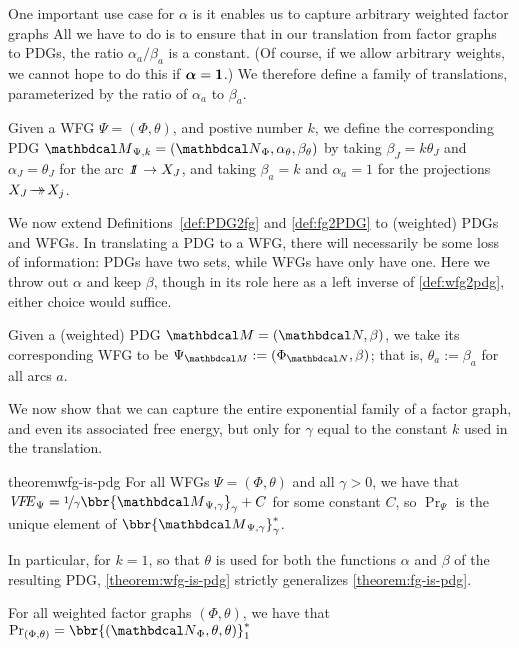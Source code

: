 One important use case for $\alpha$ is 
    it enables us to capture arbitrary weighted factor graphs
All we have to do is to ensure that in our translation from
factor graphs to PDGs, the ratio $\alpha_a/\beta_a$ is a
constant.  (Of course, if we allow arbitrary weights, we cannot hope
to do this if $\boldsymbol\alpha = \mathbf 1$.)  
We therefore define a family of translations, parameterized by the
ratio of $\alpha_a$ to $\beta_a$.
\begin{defn}\label{def:wfg2pdg}
Given a WFG
$\Psi=(\Phi, \theta)$,
and postive number $k$, 
we define the corresponding PDG $\PDGof{\Psi,k} = (\UPDGof{\Phi},\alpha_{\theta}, \beta_{\theta})$ 
by taking $\beta_J = k \theta_J$ and $\alpha_J = \theta_J$ for the arc
 $\pdgunit  \rightarrow X_J$, and
taking $\beta_a = k$ and $\alpha_a = 1$ for the projections $X_J \!\rightarrow\mathrel{\mspace{-15mu}}\rightarrow\! X_j$.
\end{defn}

We now extend Definitions~\ref{def:PDG2fg} and \ref{def:fg2PDG} to
(weighted) PDGs and WFGs.  
In translating a PDG to a WFG, 
there will necessarily be some loss of information: PDGs have two sets, while WFGs have 
only have one. Here we throw out $\alpha$ and keep $\beta$, 
though in its role here as a left inverse of \cref{def:wfg2pdg},
either choice would suffice. 


\begin{defn}
Given a (weighted) PDG $\dg M =
(\dg N, \beta)$, we take its corresponding WFG to be $\WFGof{\dg M} :=
(\FGof{\dg N}, \beta)$; that is, $\theta_a := \beta_a$ for all arcs $a$.
\end{defn}
We now show that we can capture the entire exponential family of a factor graph,
and even its associated free energy, 
but only for $\gamma$ equal to the constant $k$ used in
the translation.  


\begin{linked}{theorem}{wfg-is-pdg}
For all WFGs $\Psi = (\Phi,\theta)$ and all $\gamma > 0$,
we have that
$\VFE_\Psi
= \nicefrac1{\gamma} \bbr{{\dg M}_{\Psi,\gamma}}_{\gamma} 
+ C$   
for some constant $C$, so
$\Pr_{\Psi}$ is the unique element of
$\bbr{{\dg M}_{\Psi,\gamma}}_{\gamma}^*$.
\end{linked}

In particular, for $k\!=\!1$, so that $\theta$ is used for both the functions
$\alpha$ and $\beta$ of the resulting PDG,
\cref{theorem:wfg-is-pdg} strictly generalizes \cref{theorem:fg-is-pdg}.
\begin{coro}
	For all weighted factor graphs $(\Phi, \theta)$,
	we have that
	$\Pr_{(\Phi,\theta)} = \bbr{(\UPDGof{\Phi}, \theta,\theta)}_1^*$
\end{coro}

